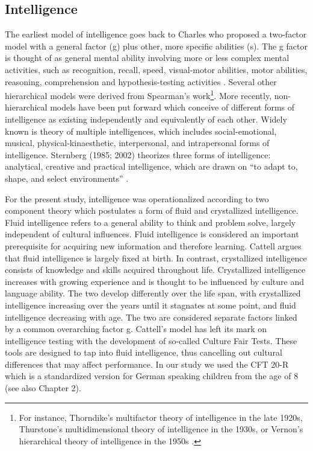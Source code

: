 \documentclass[output=paper]{langscibook}
\begin{document}
\subsection{Intelligence} %

The earliest model of intelligence goes back to Charles \citet{Spearman1904} who proposed a two-factor model with a general factor (g) plus other, more specific abilities (s). The g factor is thought of as general mental ability involving more or less complex mental activities, such as recognition, recall, speed, visual-motor abilities, motor abilities, reasoning, comprehension and hypothesis-testing activities \citep{Sattler2001}. Several other hierarchical models were derived from Spearman’s work\footnote{For instance, Thorndike’s multifactor theory of intelligence in the late 1920s, Thurstone’s multidimensional theory of intelligence in the 1930s, or Vernon’s hierarchical theory of intelligence in the 1950s \citep{Sattler2001}.}. More recently, non-hierarchical models have been put forward which conceive of different forms of intelligence as existing independently and equivalently of each other. Widely known is  theory of multiple intelligences, which includes social-emotional, musical, physical-kinaesthetic, interpersonal, and intrapersonal forms of intelligence. Sternberg (1985; 2002) theorizes three forms of intelligence: analytical, creative and practical intelligence, which are drawn on “to adapt to, shape, and select environments” \citep[15]{Sternberg2002}.

For the present study, intelligence was operationalized according to  two component theory which postulates a form of fluid and crystallized intelligence. Fluid intelligence refers to a general ability to think and problem solve, largely independent of cultural influences. Fluid intelligence is considered an important prerequisite for acquiring new information and therefore learning. Cattell argues that fluid intelligence is largely fixed at birth. In contrast, crystallized intelligence consists of knowledge and skills acquired throughout life. Crystallized intelligence increases with growing experience and is thought to be influenced by culture and language ability. The two develop differently over the life span, with crystallized intelligence increasing over the years until it stagnates at some point, and fluid intelligence decreasing with age. The two are considered separate factors linked by a common overarching factor g.  Cattell’s model has left its mark on intelligence testing with the development of so-called Culture Fair Tests. These tools are designed to tap into fluid intelligence, thus cancelling out cultural differences that may affect performance. In our study we used the CFT 20-R which is a standardized version for German speaking children from the age of 8 (see also Chapter 2).
\end{document}
